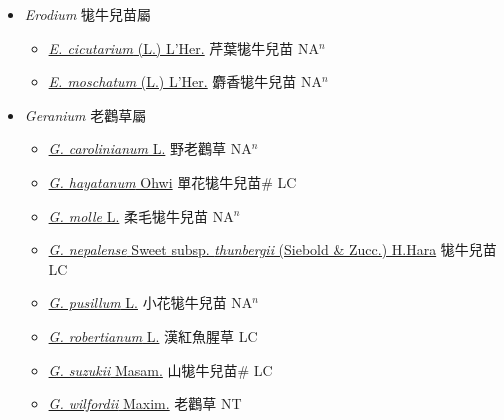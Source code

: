 
  \begin{itemize}
 \item[] \textit{Erodium} 牻牛兒苗屬
                    
  \begin{itemize}
        \item[] \href{http://www.theplantlist.org/tpl1.1/search?q=Erodium+cicutarium}{\textit{E. cicutarium} (L.) L'Her.}   芹葉牻牛兒苗 NA$^n$
        \item[] \href{http://www.theplantlist.org/tpl1.1/search?q=Erodium+moschatum}{\textit{E. moschatum} (L.) L'Her.}   麝香牻牛兒苗 NA$^n$
  \end{itemize}
 \item[] \textit{Geranium} 老鸛草屬
                    
  \begin{itemize}
        \item[] \href{http://www.theplantlist.org/tpl1.1/search?q=Geranium+carolinianum}{\textit{G. carolinianum} L.}   野老鸛草 NA$^n$
        \item[] \href{http://www.theplantlist.org/tpl1.1/search?q=Geranium+hayatanum}{\textit{G. hayatanum} Ohwi}   單花牻牛兒苗\# LC
        \item[] \href{http://www.theplantlist.org/tpl1.1/search?q=Geranium+molle}{\textit{G. molle} L.}   柔毛牻牛兒苗 NA$^n$
        \item[] \href{http://www.theplantlist.org/tpl1.1/search?q=Geranium+nepalense+subsp.+thunbergii}{\textit{G. nepalense} Sweet subsp. \textit{thunbergii} (Siebold \& Zucc.) H.Hara}   牻牛兒苗 LC
        \item[] \href{http://www.theplantlist.org/tpl1.1/search?q=Geranium+pusillum}{\textit{G. pusillum} L.}   小花牻牛兒苗 NA$^n$
        \item[] \href{http://www.theplantlist.org/tpl1.1/search?q=Geranium+robertianum}{\textit{G. robertianum} L.}   漢紅魚腥草 LC
        \item[] \href{http://www.theplantlist.org/tpl1.1/search?q=Geranium+suzukii}{\textit{G. suzukii} Masam.}   山牻牛兒苗\# LC
        \item[] \href{http://www.theplantlist.org/tpl1.1/search?q=Geranium+wilfordii}{\textit{G. wilfordii} Maxim.}   老鸛草 NT
  \end{itemize}
  \end{itemize}
